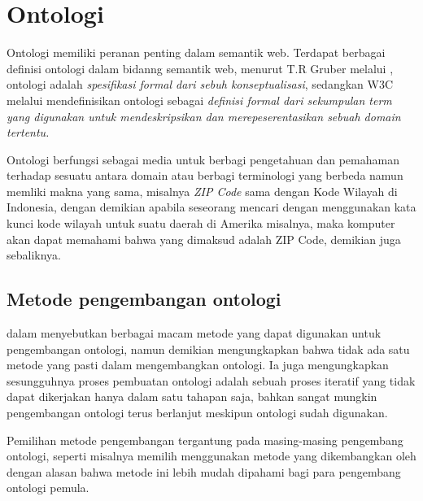 \section{Ontologi}
Ontologi memiliki peranan penting dalam semantik web. Terdapat berbagai definisi ontologi dalam bidanng semantik web, menurut T.R Gruber melalui \citet*{antoniou}, ontologi adalah \emph{spesifikasi formal dari sebuh konseptualisasi}, sedangkan W3C melalui \citet{liyang_yu} mendefinisikan ontologi sebagai \emph{definisi formal dari sekumpulan term yang digunakan untuk mendeskripsikan dan merepeserentasikan sebuah domain tertentu.}

Ontologi berfungsi sebagai media untuk berbagi pengetahuan dan pemahaman terhadap sesuatu antara domain atau berbagi terminologi yang berbeda namun memliki makna yang sama, misalnya \emph{ZIP Code} sama dengan Kode Wilayah di Indonesia, dengan demikian apabila seseorang mencari dengan menggunakan kata kunci kode wilayah untuk suatu daerah di Amerika misalnya, maka komputer akan dapat memahami bahwa yang dimaksud adalah ZIP Code, demikian juga sebaliknya.

\subsection{Metode pengembangan ontologi}
\citet{fernandez_lopez} dalam \citet*{fonou_huisman} menyebutkan berbagai macam metode yang dapat digunakan untuk pengembangan ontologi, namun demikian \citet{noy_mcguinness} mengungkapkan bahwa tidak ada satu metode yang pasti dalam mengembangkan ontologi. Ia juga mengungkapkan sesungguhnya proses pembuatan ontologi adalah sebuah proses iteratif yang tidak dapat dikerjakan hanya dalam satu tahapan saja, bahkan sangat mungkin pengembangan ontologi terus berlanjut meskipun ontologi sudah digunakan. 

Pemilihan metode pengembangan tergantung pada masing-masing pengembang ontologi, seperti misalnya \citet*{fonou_huisman} memilih menggunakan metode yang dikembangkan oleh \citet*{uschold_king} dengan alasan bahwa metode ini lebih mudah dipahami bagi para pengembang ontologi pemula.

